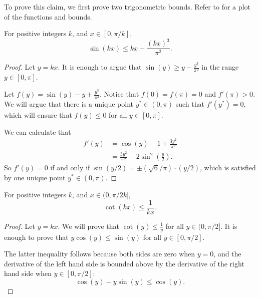 To prove this claim, we first prove two trigonometric bounds. Refer to  for a plot of the functions and bounds.

\begin{claim}
    \label{claim:center1}
    For positive integers $k$, and $x\in[0,\pi/k]$,
    \[\sin(kx)\le kx-\frac{(kx)^3}{\pi^2}. \]
\end{claim}

\begin{proof}
    Let $y=kx$. It is enough to argue that $\sin(y)\ge y-\frac{y^3}{\pi^2}$ in the range $y\in[0,\pi]$.
    
    Let $f(y)=\sin(y)-y+\frac{y^3}{\pi^2}$. Notice that $f(0)=f(\pi)=0$ and $f'(\pi)>0$. We will argue that there is a unique point $y^*\in (0,\pi)$ such that $f'(y^*)=0$, which will ensure that $f(y)\le 0$ for all $y\in [0,\pi]$.
    
    We can calculate that 
    \begin{align*}
        f'(y) &= \cos(y)-1+\frac{3y^2}{\pi^2}\\
        &= \frac{3y^2}{\pi^2}-2\sin^2\left(\frac{y}{2}\right).
    \end{align*}
    So $f'(y)=0$ if and only if $\sin(y/2)= \pm (\sqrt{6}/\pi)\cdot (y/2)$, which is satisfied by one unique point $y^*\in(0,\pi)$.
\end{proof}

\begin{claim}
    \label{claim:center2}
    For positive integers $k$, and $x\in (0,\pi/2k]$, 
    \[\cot(kx)\le \frac{1}{kx}. \]
\end{claim}

\begin{proof}
    Let $y=kx$. We will prove that $\cot(y)\le \frac{1}{y}$ for all $y\in (0,\pi/2]$. It is enough to prove that $y\cos(y)\le \sin(y)$ for all $y\in [0,\pi/2]$.
    
    The latter inequality follows because both sides are zero when $y=0$, and the derivative of the left hand side is bounded above by the derivative of the right hand side when $y\in [0,\pi/2]$:
    \[\cos(y)-y\sin(y)\le \cos(y).  \]
\end{proof}

